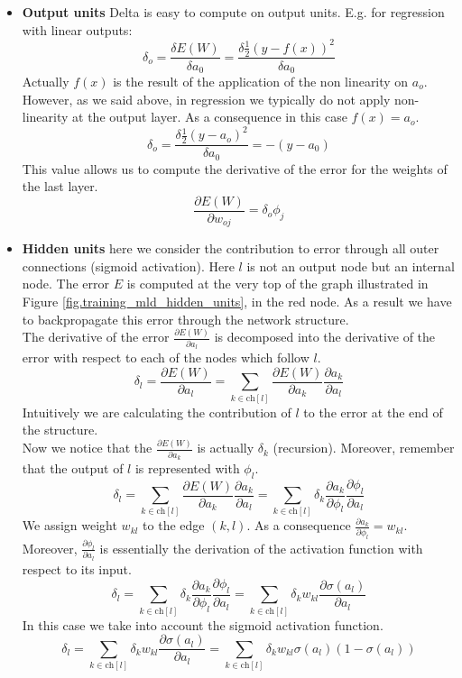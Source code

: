 \begin{itemize}
    \item \textbf{Output units}
    Delta is easy to compute on output units. E.g. for regression with linear outputs:
    $$\delta_o = \frac{\delta E(W)}{\delta a_0} = \frac{\delta \frac{1}{2} (y-f(x))^2}{\delta a_0}$$
    Actually $f(x)$ is the result of the application of the non linearity on $a_o$. However, as we said above, in regression we typically do not apply non-linearity at the output layer. As a consequence in this case $f(x)=a_o$.
    $$\delta_o = \frac{\delta \frac{1}{2} (y-a_o)^2}{\delta a_0} = -(y-a_0)$$
    This value allows us to compute the derivative of the error for the weights of the last layer.
    $$\frac{\partial E(W)}{\partial w_{oj}} = \delta_o \phi_j$$
    
    \item \textbf{Hidden units} here we consider the contribution to error through all outer connections (sigmoid activation). Here $l$ is not an output node but an internal node. The error $E$ is computed at the very top of the graph illustrated in Figure \ref{fig.training_mld_hidden_units}, in the red node. As a result we have to backpropagate this error through the network structure.\\
    The derivative of the error $\frac{\partial E(W)}{\partial a_l}$ is decomposed into the derivative of the error with respect to each of the nodes which follow $l$.
    $$\delta_l = \frac{\partial E(W)}{\partial a_l} = \sum_{k \in \text{ch}[l]} \frac{\partial E(W)}{\partial a_k} \frac{\partial a_k}{\partial a_l}$$
    Intuitively we are calculating the contribution of $l$ to the error at the end of the structure.\\
    Now we notice that the $\frac{\partial E(W)}{\partial a_k}$ is actually $\delta_k$ (recursion). Moreover, remember that the output of $l$ is represented with $\phi_l$.
    $$\delta_l = \sum_{k \in \text{ch}[l]} \frac{\partial E(W)}{\partial a_k} \frac{\partial a_k}{\partial a_l} = \sum_{k \in \text{ch}[l]} \delta_k \frac{\partial a_k}{\partial \phi_l} \frac{\partial \phi_l}{\partial a_l}$$
    We assign weight $w_{kl}$ to the edge $(k,l)$. As a consequence $\frac{\partial a_k}{\partial \phi_l} = w_{kl}$. Moreover, $\frac{\partial \phi_l}{\partial a_l}$ is essentially the derivation of the activation function with respect to its input.
    $$\delta_l = \sum_{k \in \text{ch}[l]} \delta_k \frac{\partial a_k}{\partial \phi_l} \frac{\partial \phi_l}{\partial a_l} = \sum_{k \in \text{ch}[l]} \delta_k w_{kl} \frac{\partial \sigma(a_l)}{\partial a_l}$$
    In this case we take into account the sigmoid activation function.
    $$\delta_l = \sum_{k \in \text{ch}[l]} \delta_k w_{kl} \frac{\partial \sigma(a_l)}{\partial a_l} = \sum_{k \in \text{ch}[l]} \delta_k w_{kl} \sigma(a_l) (1 - \sigma(a_l))$$
\end{itemize}

